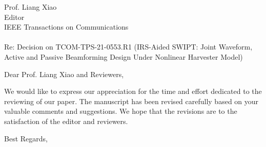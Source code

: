 \documentclass[a4paper, 10pt]{letter}
\date{}
\begin{document}
	\begin{letter}{Prof. Liang Xiao \\ Editor \\ IEEE Transactions on Communications \\ ~ \\ Re: Decision on TCOM-TPS-21-0553.R1 (IRS-Aided SWIPT: Joint Waveform, Active and Passive Beamforming Design Under Nonlinear Harvester Model)}
		\opening{Dear Prof. Liang Xiao and Reviewers,}

		We would like to express our appreciation for the time and effort dedicated to the reviewing of our paper. The manuscript has been revised carefully based on your valuable comments and suggestions. We hope that the revisions are to the satisfaction of the editor and reviewers.

		\closing{Best Regards,}
	\end{letter}
\end{document}
